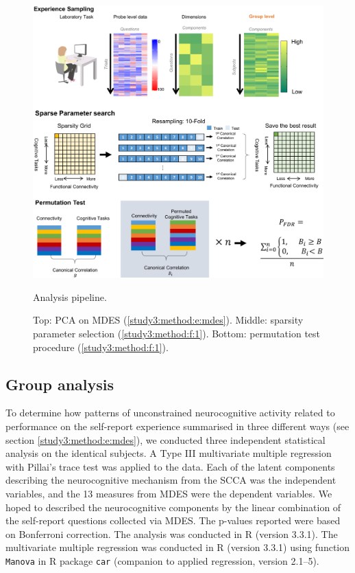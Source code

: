 \begin{figure}[H]
    \centering
    \includegraphics[width=1\textwidth]{study3/image/study3fig1.jpg}
    \caption{Analysis pipeline.}
    \label{fig:study3:fig1}
    \caption*{\footnotesize{
    Top: PCA on MDES (\cref{study3:method:e:mdes}).
    Middle: sparsity parameter selection (\cref{study3:method:f:1}). 
    Bottom: permutation test procedure (\cref{study3:method:f:1}).
    }} %
\end{figure}

\subsection{Group analysis}
\label{study3:method:g}

To determine how patterns of unconstrained neurocognitive activity related to performance on the self-report experience summarised in three different ways (see section \ref{study3:method:e:mdes}),
we conducted three independent statistical analysis on the identical subjects. A Type III multivariate multiple regression with Pillai's trace test was applied to the data. Each of the latent components describing the neurocognitive mechanism from the SCCA was the independent variables, and the 13 measures from MDES were the dependent variables. We hoped to described the neurocognitive components by the linear combination of the self-report questions collected via MDES. The p-values reported were based on Bonferroni correction. The analysis was conducted in R (version 3.3.1). The multivariate multiple regression was conducted in R (version 3.3.1) using function \texttt{Manova} in R package \texttt{car} (companion to applied regression, version 2.1–5).

